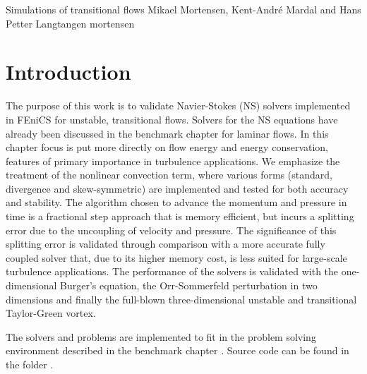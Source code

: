               {Simulations of transitional flows}
              {Mikael Mortensen, Kent-Andr\'{e} Mardal and Hans Petter Langtangen}
              {mortensen}


\renewcommand{\vec}[1]{\ensuremath{\mathbf{ #1 \xspace}}}
\newcommand{\Nset}{\ensuremath{\mathbb{N}}\xspace}
\newcommand{\Zset}{\ensuremath{\mathbb{Z}}\xspace}
\newcommand{\Qset}{\ensuremath{\mathbb{Q}}\xspace}
\newcommand{\Cset}{\ensuremath{\mathbb{C}}\xspace}
\newcommand{\Hset}{\ensuremath{\mathbb{H}}\xspace}

\section{Introduction}

The purpose of this work is to validate Navier-Stokes (NS) solvers
implemented in FEniCS for unstable, transitional flows. Solvers for
the NS equations have already been discussed in the benchmark chapter
\cite{nsValen-SendstadLoggMardalEtAl2010} for laminar flows. In this chapter focus is put more
directly on flow energy and energy conservation, features of primary
importance in turbulence applications. We emphasize the treatment of
the nonlinear convection term, where various forms (standard,
divergence and skew-symmetric) are implemented and tested for both
accuracy and stability. The algorithm chosen to advance the momentum
and pressure in time is a fractional step approach that is memory
efficient, but incurs a splitting error due to the uncoupling of
velocity and pressure. The significance of this splitting error is
validated through comparison with a more accurate fully coupled solver
that, due to its higher memory cost, is less suited for large-scale
turbulence applications. The performance of the solvers is validated
with the one-dimensional Burger's equation, the Orr-Sommerfeld
perturbation in two dimensions and finally the full-blown
three-dimensional unstable and transitional Taylor-Green vortex.

The solvers and problems are implemented to fit in the problem solving environment described in the benchmark chapter \cite{nsValen-SendstadLoggMardalEtAl2010}. Source code can be found in the folder \cite{MortensenMardal2010}.

